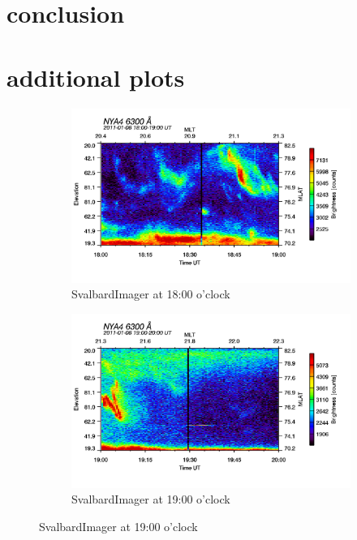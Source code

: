 \documentclass[10pt,a4paper]{article}
\begin{document}
\section{conclusion}




\newpage
\section{additional plots}

\begin{figure}[h]
\centering
\begin{subfigure}{0.3\textwidth}
\centering
	\includegraphics[width=\textwidth]{SvalbardImager6300A18.png}
	\caption{ SvalbardImager at 18:00 o'clock \label{SBI_6_18}}
\end{subfigure}
\begin{subfigure}{0.3\textwidth}
\centering
	\includegraphics[width=\textwidth]{SvalbardImager6300A19.png}
	\caption{ SvalbardImager at 19:00 o'clock \label{SBI_6_19}}

\end{subfigure}
\end{figure}
\end{document}
